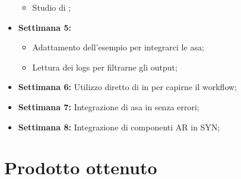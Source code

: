 \begin{itemize}
\begin{itemize}
            \item Studio di \arplug;
        \end{itemize}
    \item \textbf{Settimana 5:} 
        \begin{itemize}
            \item Adattamento dell'esempio \arplug{} per integrarci le asa;
            \item Lettura dei logs per filtrarne gli output;
        \end{itemize}
    \item \textbf{Settimana 6:} Utilizzo diretto di \arcore{} in \flutter{} per capirne il workflow;
    \item \textbf{Settimana 7:} Integrazione di asa in \flutter{} senza errori;
    \item \textbf{Settimana 8:} Integrazione di componenti AR in SYN;
\end{itemize}
\section{Prodotto ottenuto}
\todo

